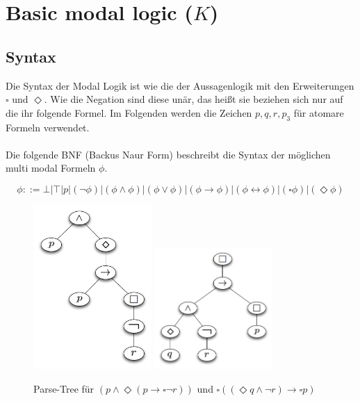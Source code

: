 

\section{Basic modal logic ($K$)} %
\label{sec:basic_modal_logic}

\subsection{Syntax} %
\label{sec:syntax}
Die Syntax der Modal Logik ist wie die der Aussagenlogik mit den Erweiterungen $\square$ und $\Diamond$. 
Wie die Negation sind diese unär, das heißt sie beziehen sich nur auf die ihr folgende Formel. Im Folgenden werden die Zeichen $p, q, r, p_3$ für atomare Formeln verwendet.\cite[S.307f]{huth2004logic}\\
\\
Die folgende BNF (Backus Naur Form) beschreibt die Syntax der möglichen multi modal Formeln $\phi$.

\begin{equation}
	\phi ::= \bot|\top|p|(\neg\phi)|(\phi\wedge\phi)|(\phi\vee\phi)|(\phi\rightarrow\phi)|
	(\phi\leftrightarrow\phi)|(\square\phi)|(\Diamond\phi)
\end{equation}

\begin{figure}[ht]
	\begin{center}
  	\includegraphics[width=0.4\textwidth]{./Images/mmFormel01.png}
		\includegraphics[width=0.4\textwidth]{./Images/mmFormel02.png}
  	\caption{Parse-Tree für $(p \wedge \Diamond(p \rightarrow \square \neg r))$ und 
		$\square((\Diamond q \wedge \neg r) \rightarrow \square p )$}
		\label{fig:mmFormel01}
	\end{center}
\end{figure}


